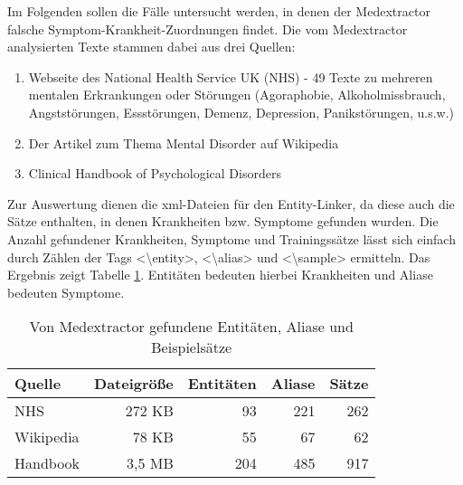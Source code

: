Im Folgenden sollen die Fälle untersucht werden, in denen der Medextractor falsche Symptom-Krankheit-Zuordnungen findet. Die vom Medextractor analysierten Texte stammen dabei aus drei Quellen:

\begin{enumerate}
	\item Webseite des National Health Service UK (NHS) - 49 Texte zu mehreren mentalen Erkrankungen oder Störungen (Agoraphobie, Alkoholmissbrauch, Angststörungen, Essstörungen, Demenz, Depression, Panikstörungen, u.s.w.) \cite{nhs_webpage}
	\item Der Artikel zum Thema Mental Disorder auf Wikipedia \cite{wikimentaldisorder}
	\item Clinical Handbook of Psychological Disorders \cite{clinicalhandbook}
\end{enumerate}

Zur Auswertung dienen die xml-Dateien für den Entity-Linker, da diese auch die Sätze enthalten, in denen Krankheiten bzw. Symptome gefunden wurden. Die Anzahl gefundener Krankheiten, Symptome und Trainingssätze lässt sich einfach durch Zählen der Tags <\textbackslash entity>, <\textbackslash alias> und <\textbackslash sample> ermitteln. Das Ergebnis zeigt Tabelle \ref{tab:zaehlung}. Entitäten bedeuten hierbei Krankheiten und Aliase bedeuten Symptome.

\begin{table}
\begin{center}
\begin{tabular}{lrrrr}
\hline
\textbf{Quelle}	& \textbf{Dateigröße}	& \textbf{Entitäten} & \textbf{Aliase} & \textbf{Sätze} \\
\hline
NHS &	272 KB & 93 & 221 & 262 \\
Wikipedia & 78 KB & 55 & 67  & 62 \\
Handbook & 3,5 MB & 204 & 485  & 917 \\
\hline
\end{tabular}
\caption{Von Medextractor gefundene Entitäten, Aliase und Beispielsätze}
\label{tab:zaehlung}
\end{center}
\end{table}

